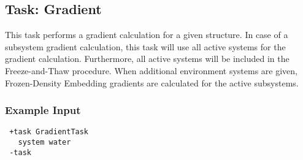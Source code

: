 \subsection{Task: Gradient}
This task performs a gradient calculation for a given structure. In case of a subsystem gradient calculation, this task will use all active systems for the gradient calculation. Furthermore, all active systems will be included in the Freeze-and-Thaw procedure. When additional environment systems are given, Frozen-Density Embedding gradients are calculated for the active subsystems.
\subsubsection{Example Input}
\begin{lstlisting}
 +task GradientTask
   system water
 -task
\end{lstlisting}
